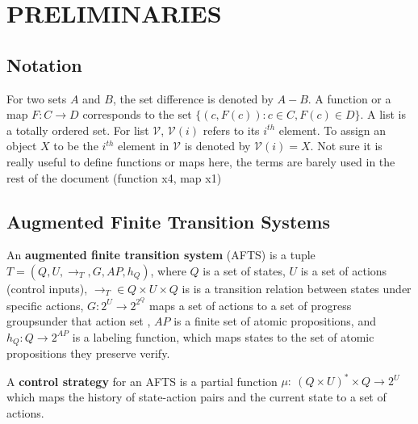 \section{PRELIMINARIES}
\label{sec:pre}
\subsection{Notation}

For two sets $ A $ and $ B $, the set difference is denoted by $ A-B $. A function or a map $ F: C\rightarrow D $ {\color{purple} corresponds to  the set} $ \{(c,F(c)):c\in C, F(c)\in D \} $. A list is a totally ordered set. For list $ \mathcal{V} $, $ \mathcal{V}(i) $ refers to its $ i^{th} $ element. To assign an object $ X $ to be the $ i^{th} $ element in	 $ \mathcal{V} $ is denoted by $ \mathcal{V}(i) = X $. {\color{purple} Not sure it is really useful to define functions or maps here, the terms are barely used in the rest of the document (function x4, map x1)} 

\subsection{Augmented Finite Transition Systems}

\begin{definition}
	An \textbf{augmented finite transition system} (AFTS) \cite{Nilsson2017} is a tuple $ T = (Q,U,\rightarrow_T, G,AP,h_Q) $, where $ Q $ is a set of states, $U$ is a set of actions (control inputs), $ \rightarrow_T\in Q\times U \times Q $ is {\color{purple} is a transition relation} between states under specific actions, $ G: 2^U\rightarrow 2^{2^Q} $ {\color{teal}maps a set of actions to a set of progress groups\footnotemark under that action set }, $ AP $ is a finite set of atomic propositions, and $ h_Q: Q\rightarrow 2^{AP} $ is a labeling function, which maps states to the set of atomic propositions they preserve {\color{purple} verify}. 
\end{definition}

\begin{definition}
	A \textbf{control strategy} for an AFTS is a partial function $ \mu:~(Q\times U)^*\times Q\rightarrow 2^U $ which maps the history of state-action pairs and the current state to a set of actions.
\end{definition}

